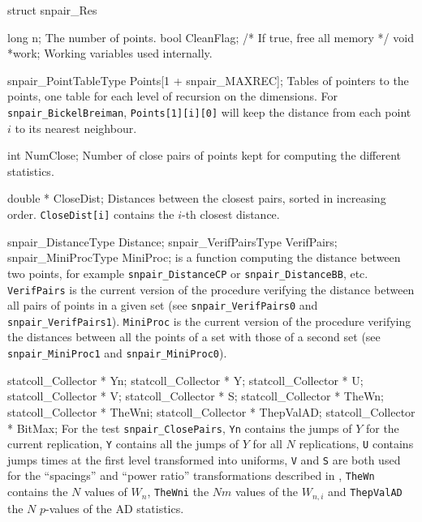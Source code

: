 struct snpair_Res {

   long n;
\endcode
 \tabb The number of points.
 \endtabb
\fi
\hide  %
\code
   bool CleanFlag;               /* If true, free all memory */
   void *work;
\endcode
 \tabb Working variables used internally.
 \endtabb
\endhide
\ifdetailed
\code

   snpair_PointTableType Points[1 + snpair_MAXREC];
\endcode
 \tabb  Tables of pointers to the points, one table for each
   level of recursion on the dimensions.
   For {\tt snpair\_BickelBreiman}, {\tt Points[1][i][0]}
   will keep the distance from each
   point $i$ to its nearest neighbour.
 \endtabb
\code

   int NumClose;
\endcode
 \tabb  Number of close pairs of points kept for computing the different
   statistics.
 \endtabb
\code

   double * CloseDist;
\endcode
 \tabb  Distances between the closest pairs, sorted in increasing order.
   {\tt CloseDist[i]} contains the $i$-th closest distance.
 \endtabb
\fi\hide  %
\code

   snpair_DistanceType   Distance;
   snpair_VerifPairsType VerifPairs;
   snpair_MiniProcType   MiniProc;
\endcode
  is a function computing the distance between
  two points,  for example {\tt snpair\_Dis\-tanceCP} or
  {\tt snpair\_DistanceBB}, etc.
  {\tt VerifPairs} is the current version of the procedure
  verifying the distance between all pairs of points in a given set
  (see {\tt snpair\_VerifPairs0} and {\tt snpair\_VerifPairs1}).
  {\tt MiniProc} is the current version of the procedure
  verifying the distances between all the points of a set  with
  those of a second set (see {\tt snpair\_MiniProc1}
  and {\tt snpair\_MiniProc0}).
 \endtabb
\endhide\ifdetailed  %
\code

   statcoll_Collector * Yn;
   statcoll_Collector * Y;
   statcoll_Collector * U;
   statcoll_Collector * V;
   statcoll_Collector * S;
   statcoll_Collector * TheWn;
   statcoll_Collector * TheWni;
   statcoll_Collector * ThepValAD;
   statcoll_Collector * BitMax;
\endcode
 \tabb For the test {\tt snpair\_ClosePairs},
  {\tt Yn} contains the jumps of $Y$ for the current replication,
 {\tt Y} contains all the jumps of $Y$ for all $N$ replications,
 {\tt U} contains jumps times at the first level transformed into
  uniforms, {\tt V} and {\tt S} are both used for the
 ``spacings'' and ``power ratio'' transformations described
 in \cite{rLEC00c},
 {\tt TheWn} contains the $N$ values of $W_n$,
 {\tt TheWni} the $Nm$ values of the $W_{n,i}$ and
 {\tt ThepValAD} the $N$ $p$-values of the AD statistics.

}
